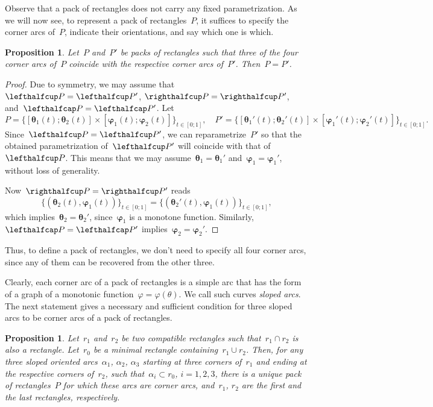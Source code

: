 \documentclass{amsart}
\def\cabl#1{\lefthalfcup#1}
\def\cabr#1{\righthalfcup#1}
\def\catl#1{\lefthalfcap#1}
\theoremstyle{theorem}
\newtheorem{prop}[theo]{Proposition}
\theoremstyle{remark}
\theoremstyle{definition}
\numberwithin{equation}{section}
\numberwithin{figure}{section}
\begin{document}
Observe that a pack of rectangles does not carry any fixed parametrization. 
As we will now see, to represent
a pack of rectangles~$P$, it suffices to specify the corner arcs of~$P$,
indicate their orientations, and say which one is which.

\begin{prop}\label{pack-defined-by-arcs-prop}
Let~$P$ and~$P'$ be packs of rectangles such that three of the four corner
arcs of~$P$ coincide with the respective corner arcs of~$P'$. Then~$P=P'$.
\end{prop}

\begin{proof}
Due to symmetry, we may assume that~$\cabl P=\cabl{P'}$, $\cabr P=\cabr{P'}$, and~$\catl P=\catl{P'}$.
Let
$$P=\{[\boldsymbol\theta_1(t);\boldsymbol\theta_2(t)]\times[\boldsymbol\varphi_1(t);\boldsymbol\varphi_2(t)]\}_{t\in[0;1]},\quad
P'=\{[\boldsymbol\theta_1'(t);\boldsymbol\theta_2'(t)]\times[\boldsymbol\varphi_1'(t);\boldsymbol\varphi_2'(t)]\}_{t\in[0;1]}.$$
Since~$\cabl P=\cabl{P'}$, we can reparametrize~$P'$ so that the obtained parametrization of~$\cabl P'$ will coincide
with that of~$\cabl P$. This means that we may assume~$\boldsymbol\theta_1=\boldsymbol\theta_1'$ and~$\boldsymbol\varphi_1=\boldsymbol\varphi_1'$, without loss of generality.

Now~$\cabr P=\cabr {P'}$ reads
$$\{(\boldsymbol\theta_2(t),\boldsymbol\varphi_1(t))\}_{t\in[0;1]}=
\{(\boldsymbol\theta_2'(t),\boldsymbol\varphi_1(t))\}_{t\in[0;1]},$$
which implies~$\boldsymbol\theta_2=\boldsymbol\theta_2'$, since~$\boldsymbol\varphi_1$ is a monotone function.
Similarly, $\catl P=\catl{P'}$ implies~$\boldsymbol\varphi_2=\boldsymbol\varphi_2'$.
\end{proof}

Thus, to define a pack of rectangles, we don't need to specify all four corner arcs, since any of them
can be recovered from the other three.

Clearly, each corner arc of a pack of rectangles is a simple arc that has the form of a graph of a monotonic
function~$\varphi=\varphi(\theta)$.
We call such curves \emph{sloped arcs}. The next statement gives a necessary and sufficient condition for three
sloped arcs to be corner arcs of a pack of rectangles.

\begin{prop}
Let~$r_1$ and~$r_2$ be two compatible rectangles such that~$r_1\cap r_2$ is also a rectangle. Let~$r_0$
be a minimal rectangle containing~$r_1\cup r_2$. Then, for any three sloped oriented arcs~$\alpha_1$, $\alpha_2$, $\alpha_3$ starting
at three corners of~$r_1$ and ending at the respective corners of~$r_2$, such that~$\alpha_i\subset r_0$, $i=1,2,3$,
there is a unique pack of rectangles~$P$ for which these arcs are corner arcs, and~$r_1$, $r_2$
are the first and the last rectangles, respectively.
\end{prop}
\end{document}
